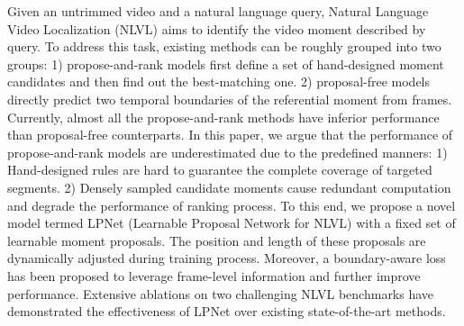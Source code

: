 Given an untrimmed video and a natural language query, Natural Language Video Localization (NLVL) aims to identify the video moment described by query. To address this task, existing methods can be roughly grouped into two groups: 1) propose-and-rank models first define a set of hand-designed moment candidates and then find out the best-matching one. 2) proposal-free models directly predict two temporal boundaries of the referential moment from frames. Currently, almost all the propose-and-rank methods have inferior performance than proposal-free counterparts. In this paper, we argue that the performance of propose-and-rank models are underestimated due to the predefined manners: 1) Hand-designed rules are hard to guarantee the complete coverage of targeted segments. 2) Densely sampled candidate moments cause redundant computation and degrade the performance of ranking process. To this end, we propose a novel model termed LPNet (Learnable Proposal Network for NLVL) with a fixed set of learnable moment proposals. The position and length of these proposals are dynamically adjusted during training process. Moreover, a boundary-aware loss has been proposed to leverage frame-level information and further improve performance. Extensive ablations on two challenging NLVL benchmarks have demonstrated the effectiveness of LPNet over existing state-of-the-art methods.
